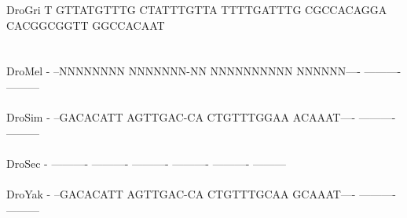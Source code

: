 \documentclass[11pt,twoside,reqno,a4paper]{article}
\begin{document}
{DroGri	T	GTTATGTTTG	CTATTTGTTA	TTTTGATTTG	CGCCACAGGA	CACGGCGGTT	GGCCACAAT\\
\hspace*{7\charwidth}\hspace*{1\charwidth}\hspace*{1\charwidth}\hspace*{1\charwidth}\hspace*{1\charwidth}\hspace*{1\charwidth}\hspace*{1\charwidth}\\
\\
DroMel	-	--NNNNNNNN	NNNNNNN-NN	NNNNNNNNNN	NNNNNN----	----------	---------\\
\hspace*{7\charwidth}\hspace*{1\charwidth}\hspace*{1\charwidth}\hspace*{1\charwidth}\hspace*{1\charwidth}\hspace*{1\charwidth}\hspace*{1\charwidth}\\
DroSim	-	--GACACATT	AGTTGAC-CA	CTGTTTGGAA	ACAAAT----	----------	---------\\
\hspace*{7\charwidth}\hspace*{1\charwidth}\hspace*{1\charwidth}\hspace*{1\charwidth}\hspace*{1\charwidth}\hspace*{1\charwidth}\hspace*{1\charwidth}\\
DroSec	-	----------	----------	----------	----------	----------	---------\\
\hspace*{7\charwidth}\hspace*{1\charwidth}\hspace*{1\charwidth}\hspace*{1\charwidth}\hspace*{1\charwidth}\hspace*{1\charwidth}\hspace*{1\charwidth}\\
DroYak	-	--GACACATT	AGTTGAC-CA	CTGTTTGCAA	GCAAAT----	----------	---------\\
\hspace*{7\charwidth}\hspace*{1\charwidth}\hspace*{1\charwidth}\hspace*{1\charwidth}\hspace*{1\charwidth}\hspace*{1\charwidth}\hspace*{1\charwidth}\\
}
\end{document}
